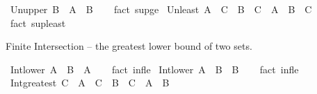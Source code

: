 \begin{isabellebody}
\isanewline
%
\endisadelimproof
\isanewline
{}\isamarkupfalse%
\ Un{\isacharunderscore}{\kern0pt}upper{}{\isacharcolon}{\kern0pt}\ {\isachardoublequoteopen}B\ {\isasymsubseteq}\ A\ {\isasymunion}\ B{\isachardoublequoteclose}\isanewline
%
\isadelimproof
\ \ %
\endisadelimproof
%
\isatagproof
{}\isamarkupfalse%
\ {\isacharparenleft}{\kern0pt}fact\ sup{\isacharunderscore}{\kern0pt}ge{}{\isacharparenright}{\kern0pt}%
\endisatagproof
{\isafoldproof}%
%
\isadelimproof
\isanewline
%
\endisadelimproof
\isanewline
{}\isamarkupfalse%
\ Un{\isacharunderscore}{\kern0pt}least{\isacharcolon}{\kern0pt}\ {\isachardoublequoteopen}A\ {\isasymsubseteq}\ C\ {\isasymLongrightarrow}\ B\ {\isasymsubseteq}\ C\ {\isasymLongrightarrow}\ A\ {\isasymunion}\ B\ {\isasymsubseteq}\ C{\isachardoublequoteclose}\isanewline
%
\isadelimproof
\ \ %
\endisadelimproof
%
\isatagproof
{}\isamarkupfalse%
\ {\isacharparenleft}{\kern0pt}fact\ sup{\isacharunderscore}{\kern0pt}least{\isacharparenright}{\kern0pt}%
\endisatagproof
{\isafoldproof}%
%
\isadelimproof
%
\endisadelimproof
%
\begin{isamarkuptext}%
\medskip Finite Intersection -- the greatest lower bound of two sets.%
\end{isamarkuptext}\isamarkuptrue%
\isamarkupfalse%
\ Int{\isacharunderscore}{\kern0pt}lower{}{\isacharcolon}{\kern0pt}\ {\isachardoublequoteopen}A\ {\isasyminter}\ B\ {\isasymsubseteq}\ A{\isachardoublequoteclose}\isanewline
%
\isadelimproof
\ \ %
\endisadelimproof
%
\isatagproof
{}\isamarkupfalse%
\ {\isacharparenleft}{\kern0pt}fact\ inf{\isacharunderscore}{\kern0pt}le{}{\isacharparenright}{\kern0pt}%
\endisatagproof
{\isafoldproof}%
%
\isadelimproof
\isanewline
%
\endisadelimproof
\isanewline
{}\isamarkupfalse%
\ Int{\isacharunderscore}{\kern0pt}lower{}{\isacharcolon}{\kern0pt}\ {\isachardoublequoteopen}A\ {\isasyminter}\ B\ {\isasymsubseteq}\ B{\isachardoublequoteclose}\isanewline
%
\isadelimproof
\ \ %
\endisadelimproof
%
\isatagproof
{}\isamarkupfalse%
\ {\isacharparenleft}{\kern0pt}fact\ inf{\isacharunderscore}{\kern0pt}le{}{\isacharparenright}{\kern0pt}%
\endisatagproof
{\isafoldproof}%
%
\isadelimproof
\isanewline
%
\endisadelimproof
\isanewline
{}\isamarkupfalse%
\ Int{\isacharunderscore}{\kern0pt}greatest{\isacharcolon}{\kern0pt}\ {\isachardoublequoteopen}C\ {\isasymsubseteq}\ A\ {\isasymLongrightarrow}\ C\ {\isasymsubseteq}\ B\ {\isasymLongrightarrow}\ C\ {\isasymsubseteq}\ A\ {\isasyminter}\ B{\isachardoublequoteclose}\isanewline

\end{isabellebody}
